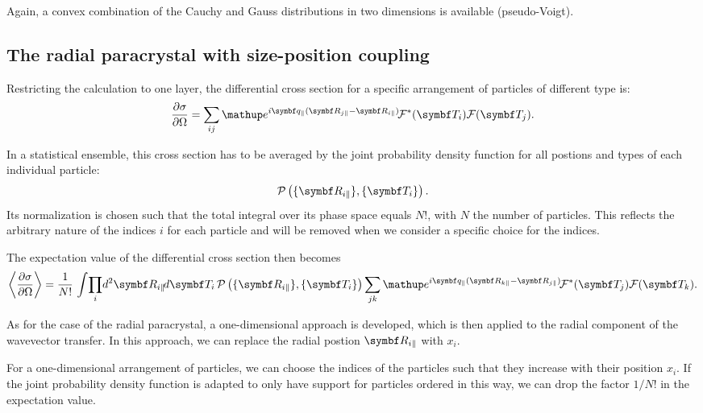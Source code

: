Again, a convex combination of the Cauchy and Gauss distributions in two dimensions is available (pseudo-Voigt).

\subsection{The radial paracrystal with size-position coupling} \label{sec:sect:sscaparacrystal}

Restricting the calculation to one layer, the differential cross section for a specific arrangement of particles of
different type is:
\begin{equation}
  \frac{\partial\sigma}{\partial\Omega}
  =
  \sum_{ij}  \e^{i\q_{\plll}(\R_{j\plll}-\R_{i\plll})}\!
  \FD^*(\v{T}_i) \FD(\v{T}_j).
\end{equation}

In a statistical ensemble, this cross section has to be averaged by the joint probability density function
for all postions and types of each individual particle:
\begin{equation}
  \PD\left(\lbrace \R_{i\plll} \rbrace, \lbrace \v{T}_i \rbrace\right).
\end{equation}
Its normalization is chosen such that the total integral over its phase space equals $N!$,
with $N$ the number of particles. This reflects the arbitrary nature of the indices $i$ for each particle
and will be removed when we consider a specific choice for the indices.

The expectation value of the differential cross section then becomes
\begin{equation}\label{Ecsc}
  \left\langle\frac{\partial\sigma}{\partial\Omega}\right\rangle
  =
  \frac{1}{N!}\,
  \int\!\prod_i\!d^2\R_{i\plll}\!d\v{T}_i
  \,\PD\left(\lbrace \R_{i\plll} \rbrace, \lbrace \v{T}_i \rbrace\right)
  \sum_{jk}  \e^{i\q_{\plll}(\R_{k\plll}-\R_{j\plll})}\!
  \FD^*(\v{T}_j) \FD(\v{T}_k).
\end{equation}

As for the case of the radial paracrystal, a one-dimensional approach is developed, which is then
applied to the radial component of the wavevector transfer. In this approach, we can replace the radial
postion $\R_{i\plll}$ with $x_i$.

For a one-dimensional arrangement of particles, we can choose the indices of the particles such that
they increase with their position $x_i$. If the joint probability density function is adapted to only
have support for particles ordered in this way, we can drop the factor $1/N!$ in the expectation value.

